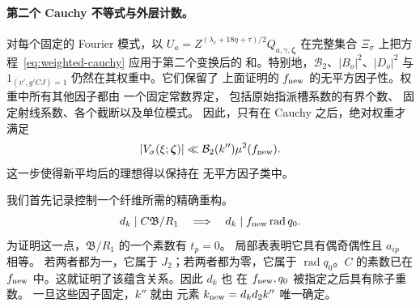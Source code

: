 \paragraph{第二个 Cauchy 不等式与外层计数。}
对每个固定的 Fourier 模式，以
\(U_a=Z^{(\lambda_c+18\eta+\tau)/2}Q_{a,\gamma,\boldsymbol\zeta}\)
在完整集合 \(\Xi_\sigma\) 上把方程~\eqref{eq:weighted-cauchy} 应用于第二个变换后的
和。特别地，\(\mathcal B_2\)、\(|B_o|^2\)、\(|D_o|^2\) 与
\(1_{(v',g'CJ)=1}\) 仍然在其权重中。它们保留了
上面证明的 \(f_{\rm new}\) 的无平方因子性。权重中所有其他因子都由
一个固定常数界定，
包括原始指派槽系数的有界个数、
固定射线系数、各个截断以及单位模式。
因此，只有在 Cauchy 之后，绝对权重才满足
\[
 |V_\sigma(\xi;\boldsymbol\zeta)|
 \ll \mathcal B_2(k'')\mu^2(f_{\rm new}).
\]
这一步使得新平均后的理想得以保持在
无平方因子类中。

我们首先记录控制一个纤维所需的精确重构。
\begin{equation}\label{eq:poisson-divisor-reconstruction}
 d_k\mid C\mathfrak B/R_1
 \quad\Longrightarrow\quad
 d_k\mid f_{\rm new}\operatorname{rad}q_0.
\end{equation}
为证明这一点，\(\mathfrak B/R_1\) 的一个素数有 \(t_p=0\)。
局部表表明它具有偶奇偶性且 \(a_{ip}\) 相等。
若两者都为一，它属于 \(J_2\)；若两者都为零，它属于
\(\operatorname{rad}q_0\)。\(C\) 的素数已在
\(f_{\rm new}\) 中。这就证明了该蕴含关系。因此 \(d_k\) 也
在 \(f_{\rm new},q_0\) 被指定之后具有除子重数。
一旦这些因子固定，\(k''\) 就由
元素 \(k_{\rm new}=d_kd_2k''\) 唯一确定。


